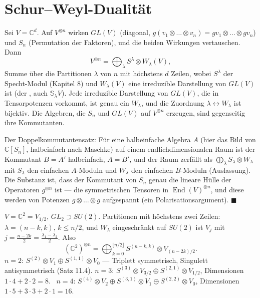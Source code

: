 \section{Schur--Weyl-Dualität}

\begin{merksatz}
Sei $V = \mathbb C^{d}$. Auf $V^{\otimes n}$ wirken $GL(V)$ (diagonal, $g(v_1\otimes\dots\otimes v_n) = gv_1\otimes\dots\otimes gv_n$) und $S_n$ (Permutation der Faktoren), und die beiden Wirkungen vertauschen. Dann
\[ V^{\otimes n} = \bigoplus_{\lambda}S^{\lambda}\otimes W_\lambda(V), \]
Summe über die Partitionen $\lambda$ von $n$ mit höchstens $d$ Zeilen, wobei $S^{\lambda}$ der Specht-Modul (Kapitel 8) und $W_\lambda(V)$ eine irreduzible Darstellung von $GL(V)$ ist (der , auch  $\mathbb S_\lambda V$). Jede irreduzible Darstellung von $GL(V)$, die in Tensorpotenzen vorkommt, ist genau ein $W_\lambda$, und die Zuordnung $\lambda\leftrightarrow W_\lambda$ ist bijektiv. Die Algebren, die $S_n$ und $GL(V)$ auf $V^{\otimes n}$ erzeugen, sind gegenseitig ihre Kommutanten.

Der Doppelkommutantensatz: Für eine halbeinfache Algebra $A$ (hier das Bild von $\mathbb C[S_n]$, halbeinfach nach Maschke) auf einem endlichdimensionalen Raum ist der Kommutant $B = A'$ halbeinfach, $A = B'$, und der Raum zerfällt als $\bigoplus_\lambda S_\lambda\otimes W_\lambda$ mit $S_\lambda$ den einfachen $A$-Moduln und $W_\lambda$ den einfachen $B$-Moduln (Auslassung). Die Substanz ist, dass der Kommutant von $S_n$ genau die lineare Hülle der Operatoren $g^{\otimes n}$ ist --- die symmetrischen Tensoren in $\operatorname{End}(V)^{\otimes n}$, und diese werden von Potenzen $g\otimes\dots\otimes g$ aufgespannt (ein Polarisationsargument). $\blacksquare$

$V = \mathbb C^{2} = V_{1/2}$, $GL_2\supset SU(2)$. Partitionen mit höchstens zwei Zeilen: $\lambda = (n - k, k)$, $k\le n/2$, und $W_\lambda$ eingeschränkt auf $SU(2)$ ist $V_j$ mit $j = \frac{n - 2k}2 = \frac{\lambda_1 - \lambda_2}2$. Also
\[ (\mathbb C^{2})^{\otimes n} = \bigoplus_{k = 0}^{\lfloor n/2\rfloor}S^{(n-k,k)}\otimes V_{(n-2k)/2} . \]
$n = 2$: $S^{(2)}\otimes V_1\oplus S^{(1,1)}\otimes V_0$ --- Triplett symmetrisch, Singulett antisymmetrisch (Satz 11.4). $n = 3$: $S^{(3)}\otimes V_{3/2}\oplus S^{(2,1)}\otimes V_{1/2}$, Dimensionen $1\cdot4 + 2\cdot2 = 8$. \checkmark\ $n = 4$: $S^{(4)}\otimes V_2\oplus S^{(3,1)}\otimes V_1\oplus S^{(2,2)}\otimes V_0$, Dimensionen $1\cdot5 + 3\cdot3 + 2\cdot1 = 16$. \checkmark


\end{merksatz}
